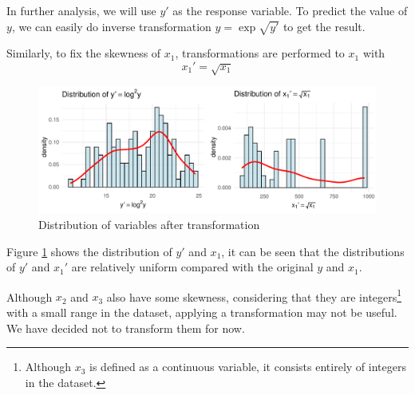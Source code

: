 In further analysis, we will use $y'$ as the response variable. To predict the value of $y$, we can easily do inverse transformation $y = \exp{\sqrt{y'}}$ to get the result.


Similarly, to fix the skewness of $x_1$, transformations are performed to $x_1$ with
\begin{equation}
x_1' = \sqrt{x_1}
\end{equation}

\begin{figure}
    \centering
    \includegraphics[width=1\linewidth]{figures/transformed_variables}
    \caption{Distribution of variables after transformation}
    \label{fig:transformed_variables}
\end{figure}

Figure \ref{fig:transformed_variables} shows the distribution of $y'$ and $x_1$, it can be seen that the distributions of $y'$ and $x_1'$ are relatively uniform compared with the original $y$ and $x_1$.

Although \( x_2 \) and \( x_3 \) also have some skewness, considering that they are integers\footnote{Although \( x_3 \) is defined as a continuous variable, it consists entirely of integers in the dataset.} with a small range in the dataset, applying a transformation may not be useful. We have decided not to transform them for now.


